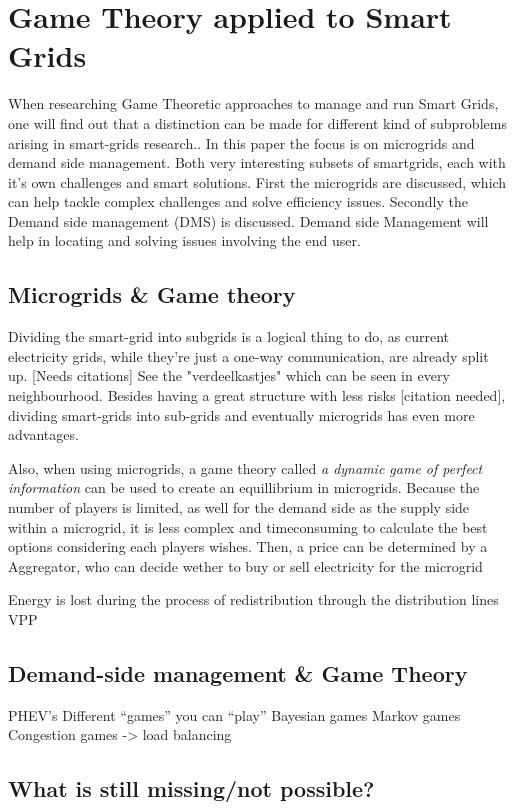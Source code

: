 \section{Game Theory applied to Smart Grids}
When researching Game Theoretic approaches to manage and run Smart Grids, one will find out that a distinction can be made for different kind of subproblems arising in smart-grids research.\cite{keypaper}. In this paper the focus is on microgrids and demand side management. Both very interesting subsets of smartgrids, each with it's own challenges and smart solutions. First the microgrids are discussed, which can help tackle complex challenges and solve efficiency issues. Secondly the Demand side management (DMS) is discussed. Demand side Management will help in locating and solving issues involving the end user. 


\subsection{Microgrids \& Game theory}
Dividing the smart-grid into subgrids is a logical thing to do, as current electricity grids, while they're just a one-way communication, are already split up. [Needs citations] See the "verdeelkastjes" which can be seen in every neighbourhood. Besides having a great structure with less risks [citation needed], dividing smart-grids into sub-grids and eventually microgrids 
has even more advantages. 


Also, when using microgrids, a game theory called \emph{a dynamic game of perfect information} %
 can be used to create an equillibrium in microgrids. Because the number of players is limited, as well for the demand side as the supply side within a microgrid, it is less complex and timeconsuming to calculate the best options considering each players wishes. Then, a price can be determined by a Aggregator, who can decide wether to buy or sell electricity for the microgrid \cite{MicrogridModellingPetrosAristidou}


Energy is lost during the process of redistribution through the distribution lines
VPP
\subsection{Demand-side management \& Game Theory}

PHEV’s
Different “games” you can “play”
Bayesian games
Markov games
Congestion games -> load balancing
\subsection{What is still missing/not possible?}
